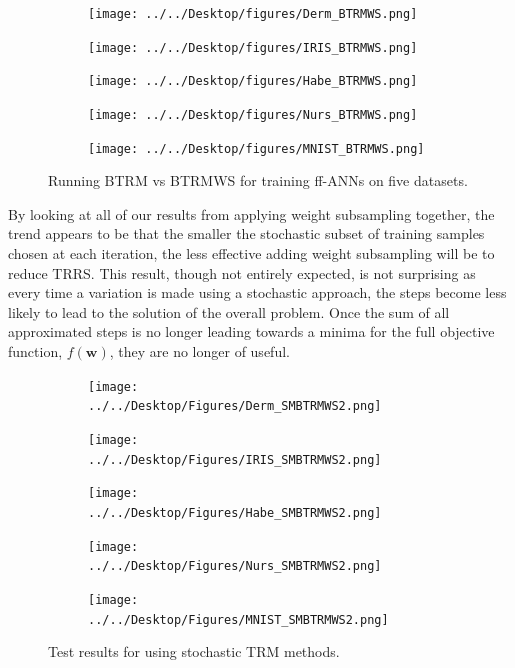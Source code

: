 \documentclass[letterpaper,12pt,titlepage,oneside,final]{book}
\begin{document}
	\begin{figure}
		\centering
		\begin{subfigure}{.45\textwidth}
			\texttt{[image: ../../Desktop/figures/Derm\_BTRMWS.png]}
		\end{subfigure}
		\begin{subfigure}{.45\textwidth}
			\texttt{[image: ../../Desktop/figures/IRIS\_BTRMWS.png]}
		\end{subfigure}
		\begin{subfigure}{.45\textwidth}
			\texttt{[image: ../../Desktop/figures/Habe\_BTRMWS.png]}
		\end{subfigure}
		\begin{subfigure}{.45\textwidth}
			\texttt{[image: ../../Desktop/figures/Nurs\_BTRMWS.png]}
		\end{subfigure}
		\begin{subfigure}{.45\textwidth}
			\texttt{[image: ../../Desktop/figures/MNIST\_BTRMWS.png]}
		\end{subfigure}
		\caption{Running BTRM vs BTRMWS for training ff-ANNs on five datasets.}
		\label{figure:BTRMWS}
	\end{figure}
	

	
	By looking at all of our results from applying weight subsampling together, the trend appears to be that the smaller the stochastic subset of training samples chosen at each iteration, the less effective adding weight subsampling will be to reduce TRRS. This result, though not entirely expected, is not surprising as every time a variation is made using a stochastic approach, the steps become less likely to lead to the solution of the overall problem. Once the sum of all approximated steps is no longer leading towards a minima for the full objective function, $f(\mathbf{w})$, they are no longer of useful.
	
	\begin{figure}
		\centering
		\begin{subfigure}{.45\textwidth}
			\texttt{[image: ../../Desktop/Figures/Derm\_SMBTRMWS2.png]}
		\end{subfigure}
		\begin{subfigure}{.45\textwidth}
			\texttt{[image: ../../Desktop/Figures/IRIS\_SMBTRMWS2.png]}
		\end{subfigure}
		\begin{subfigure}{.45\textwidth}
			\texttt{[image: ../../Desktop/Figures/Habe\_SMBTRMWS2.png]}
		\end{subfigure}
		\begin{subfigure}{.45\textwidth}
			\texttt{[image: ../../Desktop/Figures/Nurs\_SMBTRMWS2.png]}
		\end{subfigure}
		\begin{subfigure}{.45\textwidth}
			\texttt{[image: ../../Desktop/Figures/MNIST\_SMBTRMWS2.png]}
		\end{subfigure}
		\caption{Test results for using stochastic TRM methods.}
		\label{figure:SMBTRMWS}
	\end{figure}
	
\end{document}
